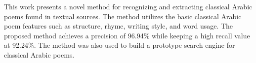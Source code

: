 This work presents a novel method for recognizing and extracting classical Arabic poems found in textual sources. The method utilizes the basic classical
 Arabic poem features such as structure, rhyme, writing style, and word usage.
 The proposed method achieves a precision of 96.94\% while keeping a high recall
 value at 92.24\%. The method was also used to build a prototype search engine
 for classical Arabic poems.

